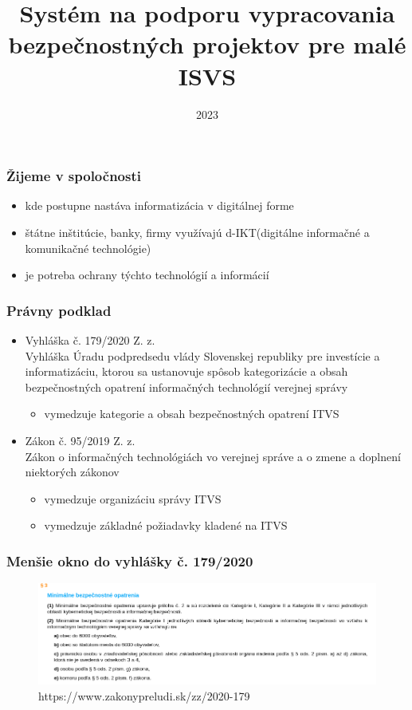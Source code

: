 \documentclass{beamer}
\title{Systém na podporu vypracovania bezpečnostných projektov pre malé ISVS}
\author{
    {Anton Kica} \\
    {\and} \\
    {\textit{Školiteľ}} \\
    {RNDr. Daniel Olejár, PhD}
}
\institute{FMFI Matfyz}
\date{2023}
\begin{document}
\frame{\titlepage}

\begin{frame}
    \frametitle{Žijeme v spoločnosti}
    \begin{itemize}
        \item kde postupne nastáva informatizácia v digitálnej forme
        \item štátne inštitúcie, banky, firmy využívajú d-IKT(digitálne informačné a komunikačné technológie)
        \item je potreba ochrany týchto technológií a informácií
    \end{itemize}
\end{frame}

\begin{frame}
    \frametitle{Právny podklad}
    \begin{itemize}
        \item Vyhláška č. 179/2020 Z. z. \\
            Vyhláška Úradu podpredsedu vlády Slovenskej republiky pre investície a informatizáciu, ktorou sa ustanovuje spôsob kategorizácie a obsah bezpečnostných opatrení informačných technológií verejnej správy 
            \begin{itemize}
                \item vymedzuje kategorie a obsah bezpečnostných opatrení ITVS
            \end{itemize}
        \item Zákon č. 95/2019 Z. z. \\
            Zákon o informačných technológiách vo verejnej správe a o zmene a doplnení niektorých zákonov
            \begin{itemize}
                \item vymedzuje organizáciu správy ITVS
                \item vymedzuje základné požiadavky kladené na ITVS
            \end{itemize}
    \end{itemize}
\end{frame}
\begin{frame}
    \frametitle{Menšie okno do vyhlášky č. 179/2020}
    \begin{figure}
        \includegraphics[width=\textwidth]{./179_2020.png}
        \caption{https://www.zakonypreludi.sk/zz/2020-179}
    \end{figure}
\end{frame}
\end{document}
